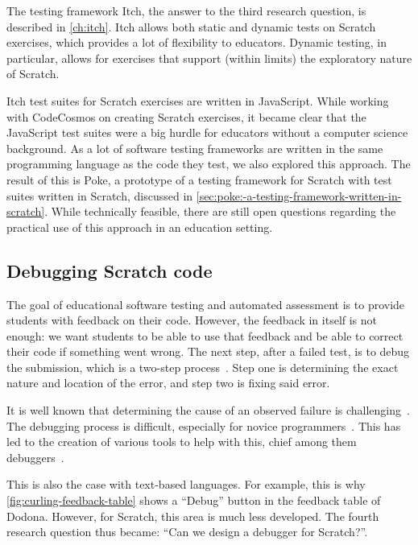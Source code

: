 \documentclass[../main]{subfiles}
\begin{document}
The testing framework Itch, the answer to the third research question, is described in \cref{ch:itch}.
Itch allows both static and dynamic tests on Scratch exercises, which provides a lot of flexibility to educators.
Dynamic testing, in particular, allows for exercises that support (within limits) the exploratory nature of Scratch.

Itch test suites for Scratch exercises are written in JavaScript.
While working with CodeCosmos on creating Scratch exercises, it became clear that the JavaScript test suites were a big hurdle for educators without a computer science background.
As a lot of software testing frameworks are written in the same programming language as the code they test, we also explored this approach.
The result of this is Poke, a prototype of a testing framework for Scratch with test suites written in Scratch, discussed in \cref{sec:poke:-a-testing-framework-written-in-scratch}.
While technically feasible, there are still open questions regarding the practical use of this approach in an education setting.

\subsection{Debugging Scratch code}\label{subsec:debugging-scratch-code}

The goal of educational software testing and automated assessment is to provide students with feedback on their code.
However, the feedback in itself is not enough: we want students to be able to use that feedback and be able to correct their code if something went wrong.
The next step, after a failed test, is to debug the submission, which is a two-step process~\autocite{myersArtSoftwareTesting2012}.
Step one is determining the exact nature and location of the error, and step two is fixing said error.

It is well known that determining the cause of an observed failure is challenging~\autocite{ammannIntroductionSoftwareTesting2016}.
The debugging process is difficult, especially for novice programmers~\autocite{mccauleyDebuggingReviewLiterature2008}.
This has led to the creation of various tools to help with this, chief among them debuggers~\autocite{rosenbergHowDebuggersWork1996}.

This is also the case with text-based languages.
For example, this is why \cref{fig:curling-feedback-table} shows a ``Debug'' button in the feedback table of Dodona.
However, for Scratch, this area is much less developed.
The fourth research question  thus became: ``Can we design a debugger for Scratch?''.
\end{document}
